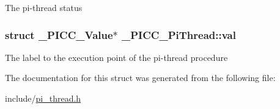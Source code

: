 The pi-\/thread status \hypertarget{struct__PICC__PiThread_a4ea626adcda4fe73b9b2fdf12b824c83}{
\subsubsection[{val}]{\setlength{\rightskip}{0pt plus 5cm}struct {\bf \-\_\-\-P\-I\-C\-C\-\_\-\-Value}$\ast$ \-\_\-\-P\-I\-C\-C\-\_\-\-Pi\-Thread\-::val}}\label{struct__PICC__PiThread_a4ea626adcda4fe73b9b2fdf12b824c83}
The label to the execution point of the pi-\/thread procedure 

The documentation for this struct was generated from the following file\-:\begin{DoxyCompactItemize}
\item 
include/\hyperlink{pi__thread_8h}{pi\-\_\-thread.\-h}\end{DoxyCompactItemize}
